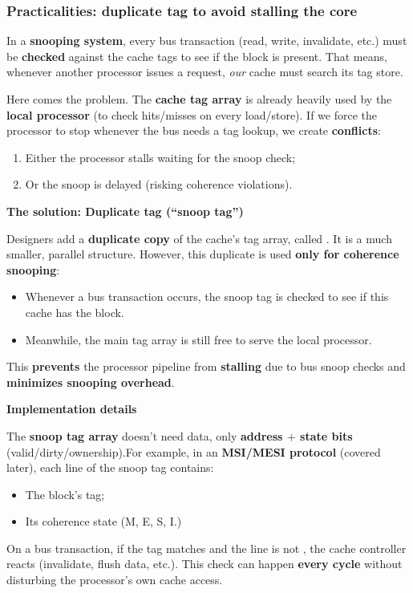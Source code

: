 \subsubsection{Practicalities: duplicate tag to avoid stalling the core}

In a \textbf{snooping system}, every bus transaction (read, write, invalidate, etc.) must be \textbf{checked} against the cache tags to see if the block is present. That means, whenever another processor issues a request, \emph{our} cache must search its tag store.

\highspace
\textcolor{Red2}{} Here comes the problem. The \textbf{cache tag array} is already heavily used by the \textbf{local processor} (to check hits/misses on every load/store). If we force the processor to stop whenever the bus needs a tag lookup, we create \textbf{conflicts}:
\begin{enumerate}
    \item Either the processor stalls waiting for the snoop check;
    \item Or the snoop is delayed (risking coherence violations).
\end{enumerate}

\begin{flushleft}
    \textcolor{Green3}{ \textbf{The solution: Duplicate tag (``snoop tag'')}}
\end{flushleft}
Designers add a \textbf{duplicate copy} of the cache's tag array, called . It is a much smaller, parallel structure. However, this duplicate is used \textbf{only for coherence snooping}:
\begin{itemize}
    \item Whenever a bus transaction occurs, the snoop tag is checked to see if this cache has the block.
    \item Meanwhile, the main tag array is still free to serve the local processor.
\end{itemize}
This \textbf{prevents} the processor pipeline from \textbf{stalling} due to bus snoop checks and \textbf{minimizes snooping overhead}.

\highspace
\begin{flushleft}
    \textcolor{Green3}{ \textbf{Implementation details}}
\end{flushleft}
The \textbf{snoop tag array} doesn't need data, only \textbf{address $+$ state bits} (valid/\break dirty/ownership).For example, in an \textbf{MSI/MESI protocol} (covered later), each line of the snoop tag contains:
\begin{itemize}
    \item The block's tag;
    \item Its coherence state (M, E, S, I.)
\end{itemize}
On a bus transaction, if the tag matches and the line is not , the cache controller reacts (invalidate, flush data, etc.). This check can happen \textbf{every cycle} without disturbing the processor's own cache access.

